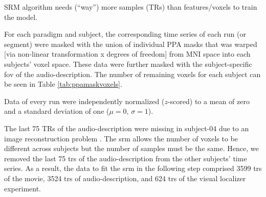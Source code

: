 



SRM algorithm needs (``way'') more samples (TRs) than features/voxels to train
the model.

For each paradigm and subject, the corresponding time series of each run (or
segment) were masked with the union of individual PPA masks
\citep[s.][]{haeusler2022processing} that was warped [via non-linear
transformation x degrees of freedom] from MNI space into each subjects' voxel
space.
These data were further masked with the subject-specific \ac{fov} of the
audio-description.
%
The number of remaining voxels for each subject can be seen in Table
\ref{tab:ppamaskvoxels}.


Data of every run were independently normalized ($z$-scored) to a mean of zero
and a standard deviation of one ($\mu=0$, $\sigma=1$).



%
The last 75 TRs of the audio-description were missing in subject-04 due to an
image reconstruction problem \citep[s.][]{hanke2014audiomovie}.
%
The \ac{srm} allows the number of voxels to be different across subjects but the
number of samples must be the same.
%
Hence, we removed the last 75 \acp{tr} of the audio-description from the other
subjects' time series.
As a result, the data to fit the \ac{srm} in the following step comprised 3599
\acp{tr} of the movie, 3524 \acp{tr} of audio-description, and 624 \acp{tr} of
the visual localizer experiment.


